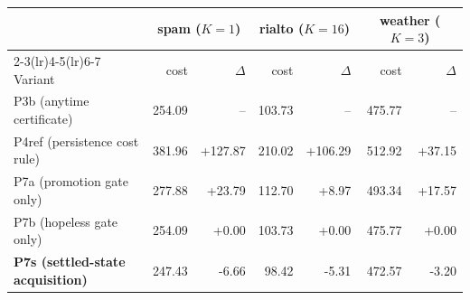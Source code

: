 \begin{tabular}{lrrrrrr}
\toprule
 & \multicolumn{2}{c}{spam ($K{=}1$)} & \multicolumn{2}{c}{rialto ($K{=}16$)} & \multicolumn{2}{c}{weather ($K{=}3$)} \\
\cmidrule(lr){2-3}\cmidrule(lr){4-5}\cmidrule(lr){6-7}
Variant & cost & $\Delta$ & cost & $\Delta$ & cost & $\Delta$ \\
\midrule
P3b (anytime certificate) & 254.09 & -- & 103.73 & -- & 475.77 & -- \\
P4ref (persistence cost rule) & 381.96 & +127.87 & 210.02 & +106.29 & 512.92 & +37.15 \\
P7a (promotion gate only) & 277.88 & +23.79 & 112.70 & +8.97 & 493.34 & +17.57 \\
P7b (hopeless gate only) & 254.09 & +0.00 & 103.73 & +0.00 & 475.77 & +0.00 \\
\textbf{P7s (settled-state acquisition)} & 247.43 & -6.66 & 98.42 & -5.31 & 472.57 & -3.20 \\
\bottomrule
\end{tabular}
